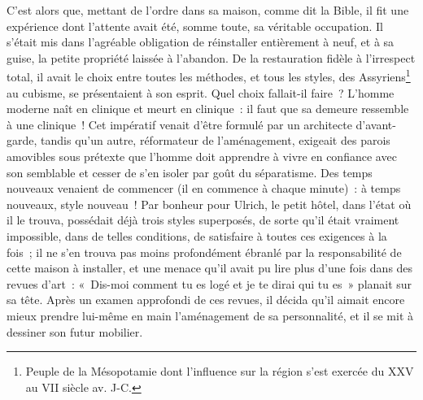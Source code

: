 
	{

C'est alors que, mettant de l'ordre dans sa maison, comme dit la Bible, il fit une expérience dont l'attente avait été, somme toute, sa véritable occupation. Il s'était mis dans l'agréable obligation de réinstaller entièrement à neuf, et à sa guise, la petite propriété laissée à l'abandon. De la restauration fidèle à l'irrespect total, il avait le choix entre toutes les méthodes, et tous les styles, des Assyriens\footnote{Peuple de la Mésopotamie dont l'influence sur la région s'est exercée du XXV\ieme{} au VII\ieme{} siècle av. J-C.} au cubisme, se présentaient à son esprit. Quel choix fallait-il faire~? L'homme moderne naît en clinique et meurt en clinique~: il faut que sa demeure ressemble à une clinique~! Cet impératif venait d'être formulé par un architecte d'avant-garde, tandis qu'un autre, réformateur de l'aménagement, exigeait des parois amovibles sous prétexte que l'homme doit apprendre à vivre en confiance avec son semblable et cesser de s'en isoler par goût du séparatisme. Des temps nouveaux venaient de commencer (il en commence à chaque minute)~: à temps nouveaux, style nouveau~! Par bonheur pour Ulrich, le petit hôtel, dans l'état où il le trouva, possédait déjà trois styles superposés, de sorte qu'il était vraiment impossible, dans de telles conditions, de satisfaire à toutes ces exigences à la fois~; il ne s'en trouva pas moins profondément ébranlé par la responsabilité de cette maison à installer, et une menace qu'il avait pu lire plus d'une fois dans des revues d'art~: «~Dis-moi comment tu es logé et je te dirai qui tu es~» planait sur sa tête. Après un examen approfondi de ces revues, il décida qu'il aimait encore mieux prendre lui-même en main l'aménagement de sa personnalité, et il se mit à dessiner son futur mobilier.
}

